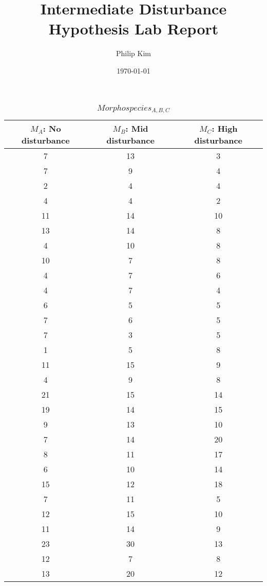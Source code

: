 \documentclass{article}
\title{Intermediate Disturbance Hypothesis Lab Report}
\author{Philip Kim}
\date{\today}
\begin{document}
\maketitle
\begin{table}[h!]
  \begin{center}
    \caption{\(Morphospecies_{A,B,C}\)}\label{tab:table1}
    \begin{tabular}{|c|c|c|}\hline
      \(M_{A}\): No disturbance & \(M_{B}\): Mid disturbance & \(M_{C}\): High disturbance \\ \hline
      7 & 13 & 3 \\ \hline
      7 & 9 & 4 \\ \hline
      2 & 4 & 4 \\ \hline
      4 & 4 & 2 \\ \hline
      11 & 14 & 10 \\ \hline
      13 & 14 & 8 \\ \hline
      4 & 10 & 8 \\ \hline
      10 & 7 & 8 \\ \hline
      4 & 7 & 6 \\ \hline
      4 & 7 & 4 \\ \hline
      6 & 5 & 5 \\ \hline
      7 & 6 & 5 \\ \hline
      7 & 3 & 5 \\ \hline
      1 & 5 & 8 \\ \hline
      11 & 15 & 9 \\ \hline
      4 & 9 & 8 \\ \hline
      21 & 15 & 14 \\ \hline
      19 & 14 & 15 \\ \hline
      9 & 13 & 10 \\ \hline
      7 & 14 & 20 \\ \hline
      8 & 11 & 17 \\ \hline
      6 & 10 & 14 \\ \hline
      15 & 12 & 18 \\ \hline
      7 & 11 & 5 \\ \hline
      12 & 15 & 10 \\ \hline
      11 & 14 & 9 \\ \hline
      23 & 30 & 13 \\ \hline
      12 & 7 & 8 \\ \hline
      13 & 20 & 12 \\ \hline
    \end{tabular}
  \end{center}

\end{table}
\end{document}
